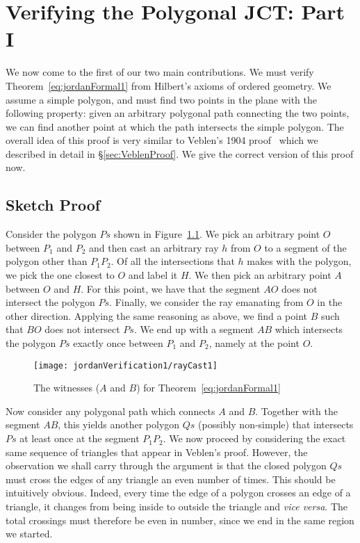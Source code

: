 \chapter{Verifying the Polygonal JCT: Part I}\label{chapter:JordanVerification1}
We now come to the first of our two main contributions. We must verify Theorem~\ref{eq:jordanFormal1} from Hilbert's axioms of ordered geometry. We assume a simple polygon, and must find two points in the plane with the following property: given an arbitrary polygonal path connecting the two points, we can find another point at which the path intersects the simple polygon. The overall idea of this proof is very similar to Veblen's 1904 proof~\cite{Veblenphd} which we described in detail in \S\ref{sec:VeblenProof}. We give the correct version of this proof now.

\section{Sketch Proof}\label{sec:ParityProofInformal}
Consider the polygon $Ps$ shown in Figure~\ref{fig:rayCast1}. We pick an arbitrary point $O$ between $P_1$ and $P_2$  and then cast an arbitrary ray $h$ from $O$ to a segment of the polygon other than $P_1P_2$. Of all the intersections that $h$ makes with the polygon, we pick the one closest to $O$ and label it $H$. We then pick an arbitrary point $A$ between $O$ and $H$. For this point, we have that the segment $AO$ does not intersect the polygon $Ps$. Finally, we consider the ray emanating from $O$ in the other direction. Applying the same reasoning as above, we find a point $B$ such that $BO$ does not intersect $Ps$. We end up with a segment $AB$ which intersects the polygon $Ps$ exactly once between $P_1$ and $P_2$, namely at the point $O$.

\begin{figure}
\centering\texttt{[image: jordanVerification1/rayCast1]}
\caption{The witnesses ($A$ and $B$) for Theorem~\ref{eq:jordanFormal1}}
\label{fig:rayCast1}
\end{figure}

\newcommand{\insideoutsideclaim}{every time the edge of a polygon crosses an edge of a triangle, it changes from being inside to outside the triangle and \emph{vice versa}}

Now consider any polygonal path which connects $A$ and $B$. Together with the segment $AB$, this yields another polygon $Qs$ (possibly non-simple) that intersects $Ps$ at least once at the segment $P_1P_2$. We now proceed by considering the exact same sequence of triangles that appear in Veblen's proof. However, the observation we shall carry through the argument is that the closed polygon $Qs$ must cross the edges of any triangle an even number of times. This should be intuitively obvious. Indeed, \insideoutsideclaim. The total crossings must therefore be even in number, since we end in the same region we started.

